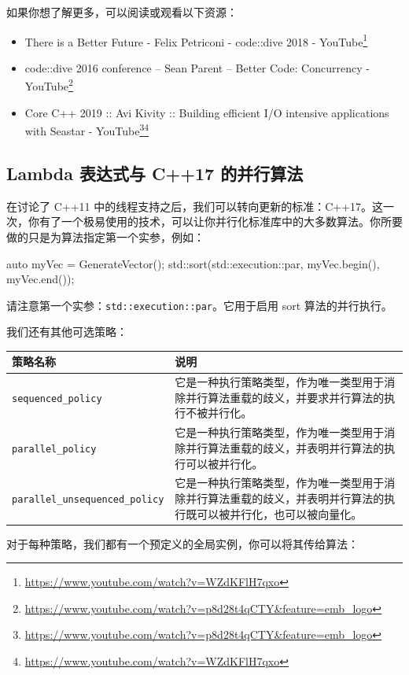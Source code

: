 如果你想了解更多，可以阅读或观看以下资源：

\begin{itemize}
\item There is a Better Future - Felix Petriconi - code::dive 2018 - YouTube\footnote{\url{https://www.youtube.com/watch?v=WZdKFlH7qxo}}
\item code::dive 2016 conference – Sean Parent – Better Code: Concurrency - YouTube\footnote{\url{https://www.youtube.com/watch?v=p8d28t4qCTY&feature=emb_logo}}
\item Core C++ 2019 :: Avi Kivity :: Building efficient I/O intensive applications with Seastar - YouTube\footnote{\url{https://www.youtube.com/watch?v=p8d28t4qCTY&feature=emb_logo}}\footnote{\url{https://www.youtube.com/watch?v=WZdKFlH7qxo}}
\end{itemize}

\subsection{Lambda 表达式与 C++17 的并行算法}

在讨论了 C++11 中的线程支持之后，我们可以转向更新的标准：C++17。这一次，你有了一个极易使用的技术，可以让你并行化标准库中的大多数算法。你所要做的只是为算法指定第一个实参，例如：

\begin{codebox}
auto myVec = GenerateVector();
std::sort(std::execution::par, myVec.begin(), myVec.end());
\end{codebox}

请注意第一个实参：\texttt{std::execution::par}。它用于启用 sort 算法的并行执行。

我们还有其他可选策略：

\noindent
\begin{tabularx}{\textwidth}{|l|X|}
\hline
策略名称 & 说明 \\
\hline
\texttt{sequenced\_policy} & 它是一种执行策略类型，作为唯一类型用于消除并行算法重载的歧义，并要求并行算法的执行不被并行化。 \\
\hline
\texttt{parallel\_policy} & 它是一种执行策略类型，作为唯一类型用于消除并行算法重载的歧义，并表明并行算法的执行可以被并行化。 \\
\hline
\texttt{parallel\_unsequenced\_policy} & 它是一种执行策略类型，作为唯一类型用于消除并行算法重载的歧义，并表明并行算法的执行既可以被并行化，也可以被向量化。 \\
\hline
\end{tabularx}

对于每种策略，我们都有一个预定义的全局实例，你可以将其传给算法：

